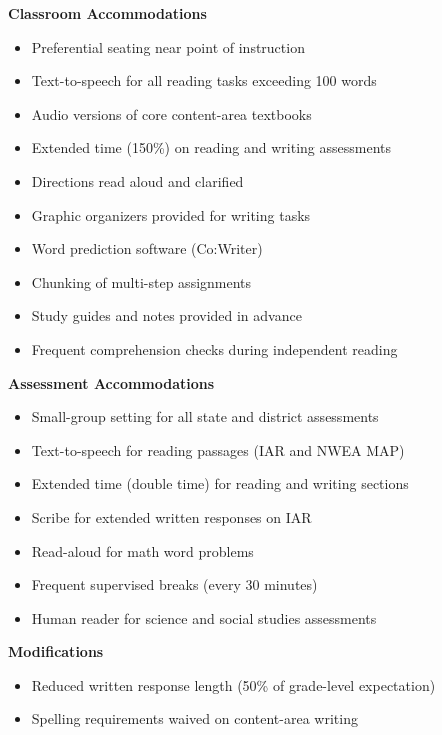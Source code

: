 \documentclass[11pt]{article}
\begin{document}
\begin{minipage}{0.48\textwidth}
\begin{iepbox}
{\bfseries\color{IEPNavy}\Large Classroom Accommodations}\\
\begin{itemize}[leftmargin=*,nosep,label=\textcolor{IEPTeal}{\faCheckSquare}]
  \item Preferential seating near point of instruction
  \item Text-to-speech for all reading tasks exceeding 100 words
  \item Audio versions of core content-area textbooks
  \item Extended time (150\%) on reading and writing assessments
  \item Directions read aloud and clarified
  \item Graphic organizers provided for writing tasks
  \item Word prediction software (Co:Writer)
  \item Chunking of multi-step assignments
  \item Study guides and notes provided in advance
  \item Frequent comprehension checks during independent reading
\end{itemize}
\end{iepbox}
\end{minipage}%
\hfill
\begin{minipage}{0.48\textwidth}
\begin{iepbox}
{\bfseries\color{IEPNavy}\Large Assessment Accommodations}\\
\begin{itemize}[leftmargin=*,nosep,label=\textcolor{IEPTeal}{\faCheckSquare}]
  \item Small-group setting for all state and district assessments
  \item Text-to-speech for reading passages (IAR and NWEA MAP)
  \item Extended time (double time) for reading and writing sections
  \item Scribe for extended written responses on IAR
  \item Read-aloud for math word problems
  \item Frequent supervised breaks (every 30 minutes)
  \item Human reader for science and social studies assessments
\end{itemize}
\vspace{4pt}
{\bfseries\color{IEPNavy} Modifications}\\[2pt]
\begin{itemize}[leftmargin=*,nosep,label=\textcolor{IEPGold}{$\bullet$}]
  \item Reduced written response length (50\% of grade-level expectation)
  \item Spelling requirements waived on content-area writing
\end{itemize}
\end{iepbox}
\end{minipage}
\end{document}
